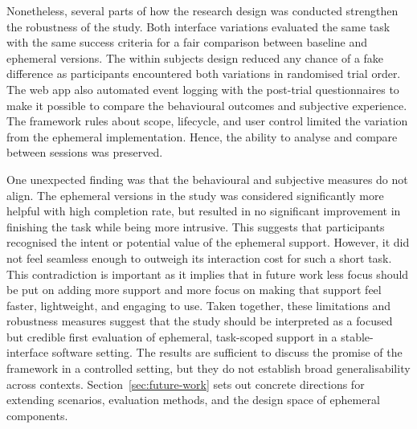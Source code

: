 Nonetheless, several parts of how the research design was conducted strengthen the robustness of the study. Both interface variations evaluated the same task with the same success criteria for a fair comparison between baseline and ephemeral versions. The within subjects design reduced any chance of a fake difference as participants encountered both variations in randomised trial order. The web app also automated event logging with the post-trial questionnaires to make it possible to compare the behavioural outcomes and subjective experience. The framework rules about scope, lifecycle, and user control limited the variation from the ephemeral implementation. Hence, the ability to analyse and compare between sessions was preserved.

One unexpected finding was that the behavioural and subjective measures do not align. The ephemeral versions in the study was considered significantly more helpful with high completion rate, but resulted in no significant improvement in finishing the task while being more intrusive. This suggests that participants recognised the intent or potential value of the ephemeral support. However, it did not feel seamless enough to outweigh its interaction cost for such a short task. This contradiction is important as it implies that in future work less focus should be put on adding more support and more focus on making that support feel faster, lightweight, and engaging to use. Taken together, these limitations and robustness measures suggest that the study should be interpreted as a focused but credible first evaluation of ephemeral, task-scoped support in a stable-interface software setting. The results are sufficient to discuss the promise of the framework in a controlled setting, but they do not establish broad generalisability across contexts. Section~\ref{sec:future-work} sets out concrete directions for extending scenarios, evaluation methods, and the design space of ephemeral components.
